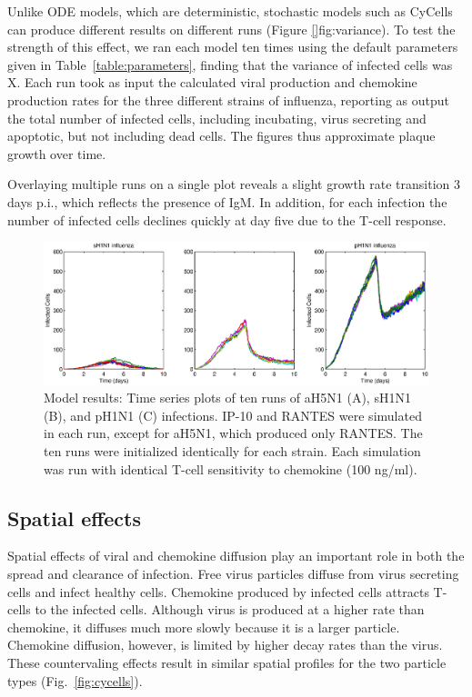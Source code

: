 \documentclass[10pt]{article}
\begin{document}
Unlike ODE models, which are deterministic, stochastic models such as CyCells can produce different results on different runs (Figure \ref{}fig:variance).  To test the strength of this effect, we ran each model ten times using the default parameters given in Table~\ref{table:parameters}, finding that the variance of infected cells was X.  Each run took as input the calculated viral production and chemokine production rates for the three different strains of influenza, reporting as output the total number of infected cells, including incubating, virus secreting and apoptotic, but not including dead cells.  The figures thus approximate plaque growth over time.

Overlaying multiple runs on a single plot reveals a slight growth rate transition 3 days p.i., which reflects the presence of IgM.  In addition, for each infection the number of infected cells declines quickly at day five due to the T-cell response. 

\begin{figure}[ht!]
\begin{center}
 \includegraphics[width=\textwidth]{variance}
 \end{center}
\caption{Model results: Time series plots of ten runs of aH5N1 (A), sH1N1 (B), and pH1N1 (C) infections. IP-10 and RANTES were simulated in each run, except for aH5N1, which  produced only RANTES.  The ten runs were initialized identically for each strain.  Each simulation was run with identical T-cell sensitivity to chemokine (100 ng/ml).} 
 \label{fig:variance}
\end{figure}


\subsection*{Spatial effects}

Spatial effects of viral and chemokine diffusion play an important role in both the spread and clearance of infection.  Free virus particles diffuse from virus secreting cells and infect healthy cells.  Chemokine produced by infected cells attracts T-cells to the infected cells.  Although virus is produced at a higher rate than chemokine, it diffuses much more slowly because it is a larger particle.  Chemokine diffusion, however, is limited by higher decay rates than the virus.  These countervaling effects result in similar spatial profiles for the two particle types (Fig.~\ref{fig:cycells}).
\end{document}
